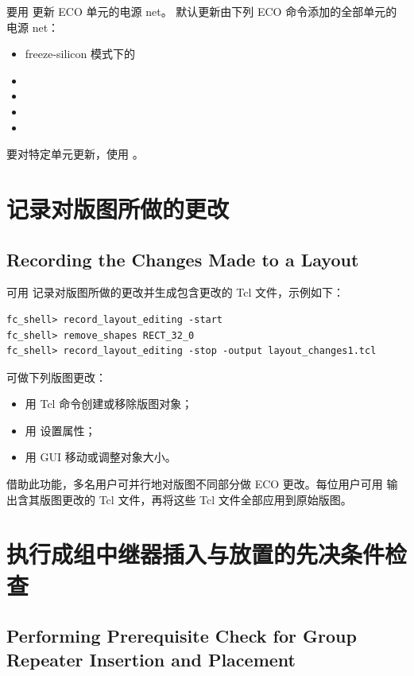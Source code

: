 要用  更新 ECO 单元的电源 net。
默认更新由下列 ECO 命令添加的全部单元的电源 net：
\begin{itemize}
  \item freeze-silicon 模式下的 
  \item {}
  \item {}
  \item {}
  \item {}
\end{itemize}
要对特定单元更新，使用  。

\section{记录对版图所做的更改}
\subsection*{Recording the Changes Made to a Layout}

可用  记录对版图所做的更改并生成包含更改的 Tcl 文件，示例如下：
\begin{lstlisting}
fc_shell> record_layout_editing -start
fc_shell> remove_shapes RECT_32_0
fc_shell> record_layout_editing -stop -output layout_changes1.tcl
\end{lstlisting}

可做下列版图更改：
\begin{itemize}
  \item 用 Tcl 命令创建或移除版图对象；
  \item 用  设置属性；
  \item 用 GUI 移动或调整对象大小。
\end{itemize}

借助此功能，多名用户可并行地对版图不同部分做 ECO 更改。每位用户可用  输出含其版图更改的 Tcl 文件，再将这些 Tcl 文件全部应用到原始版图。

\section{执行成组中继器插入与放置的先决条件检查}
\subsection*{Performing Prerequisite Check for Group Repeater Insertion and Placement}

